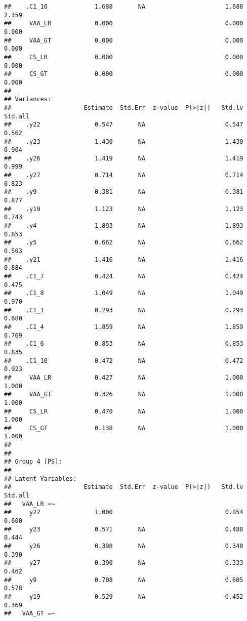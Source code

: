 \documentclass[
]{article}
\begin{document}
\begin{verbatim}
##    .C1_10             1.688       NA                      1.688    2.359
##     VAA_LR            0.000                               0.000    0.000
##     VAA_GT            0.000                               0.000    0.000
##     CS_LR             0.000                               0.000    0.000
##     CS_GT             0.000                               0.000    0.000
## 
## Variances:
##                    Estimate  Std.Err  z-value  P(>|z|)   Std.lv  Std.all
##    .y22               0.547       NA                      0.547    0.562
##    .y23               1.430       NA                      1.430    0.904
##    .y26               1.419       NA                      1.419    0.999
##    .y27               0.714       NA                      0.714    0.823
##    .y9                0.381       NA                      0.381    0.877
##    .y19               1.123       NA                      1.123    0.743
##    .y4                1.893       NA                      1.893    0.853
##    .y5                0.662       NA                      0.662    0.503
##    .y21               1.416       NA                      1.416    0.884
##    .C1_7              0.424       NA                      0.424    0.475
##    .C1_8              1.049       NA                      1.049    0.970
##    .C1_1              0.293       NA                      0.293    0.680
##    .C1_4              1.859       NA                      1.859    0.769
##    .C1_6              0.853       NA                      0.853    0.835
##    .C1_10             0.472       NA                      0.472    0.923
##     VAA_LR            0.427       NA                      1.000    1.000
##     VAA_GT            0.326       NA                      1.000    1.000
##     CS_LR             0.470       NA                      1.000    1.000
##     CS_GT             0.138       NA                      1.000    1.000
## 
## 
## Group 4 [PS]:
## 
## Latent Variables:
##                    Estimate  Std.Err  z-value  P(>|z|)   Std.lv  Std.all
##   VAA_LR =~                                                             
##     y22               1.000                               0.854    0.600
##     y23               0.571       NA                      0.488    0.444
##     y26               0.398       NA                      0.340    0.390
##     y27               0.390       NA                      0.333    0.462
##     y9                0.708       NA                      0.605    0.578
##     y19               0.529       NA                      0.452    0.369
##   VAA_GT =~                                                             

\end{verbatim}
\end{document}
